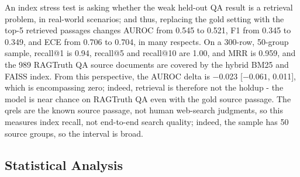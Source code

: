 \documentclass[a4paper,fleqn]{cas-sc}
\begin{document}
An index stress test is asking whether the weak held-out QA result is a retrieval problem, in real-world scenarios; and thus, replacing the gold setting with the top-5 retrieved passages changes AUROC from 0.545 to 0.521, F1 from 0.345 to 0.349, and ECE from 0.706 to 0.704, in many respects. On a 300-row, 50-group sample, recall@1 is 0.94, recall@5 and recall@10 are 1.00, and MRR is 0.959, and the 989 RAGTruth QA source documents are covered by the hybrid BM25 and FAISS index. From this perspective, the AUROC delta is $-$0.023 [$-0.061$, 0.011], which is encompassing zero; indeed, retrieval is therefore not the holdup - the model is near chance on RAGTruth QA even with the gold source passage. The qrels are the known source passage, not human web-search judgments, so this measures index recall, not end-to-end search quality; indeed, the sample has 50 source groups, so the interval is broad.

\subsection{Statistical Analysis}
\end{document}
